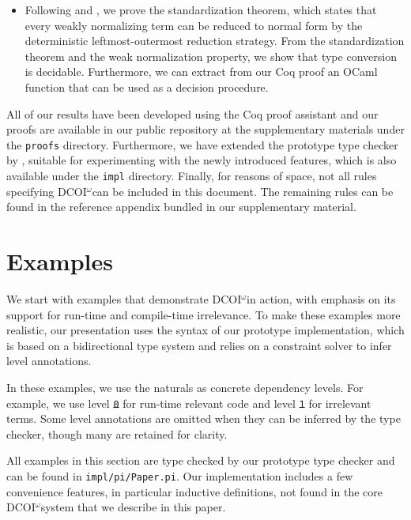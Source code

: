 \documentclass[acmsmall, screen=true, nonacm=true,
  review=\ifpublic false\else true\fi,
  anonymous=\ifanonymous true\else false\fi
]{acmart}
\makeatletter
\newcommand{\sw}[1]{}
\newcommand{\jc}[1]{}
\newcommand{\name}{\texorpdfstring{DCOI$^{\omega}$\@\xspace}{DCOI-omega}}
\newcommand{\repo}{%
  \ifpublic our public repository at \jc{TODO: replace with repo URL}%
  \else the supplementary materials%
  \fi
}
\providecommand{\DIFadd}[1]{{\protect\color{blue}\uwave{#1}}} %
\providecommand{\DIFdel}[1]{{\protect\color{red}\sout{#1}}}                      %
\providecommand{\DIFaddbegin}{} %
\providecommand{\DIFaddend}{} %
\providecommand{\DIFdelbegin}{} %
\providecommand{\DIFdelend}{} %
\makeatother
\begin{document}
\begin{itemize}[leftmargin=\parindent]
\item Following \citet{takahashi:par} and
  \citet{accattoli:factorization}, we prove the standardization
  theorem, which states that every weakly normalizing term can be
  reduced to normal form by the deterministic leftmost-outermost reduction
  strategy. From the standardization theorem and the weak
  normalization property, we show that type conversion is decidable.
  Furthermore, we can extract from our Coq proof an OCaml function that can
  be used as a decision procedure.
\end{itemize}

All of our results have been developed using the Coq proof
assistant and our proofs are available in \repo{} under the \texttt{proofs} directory.
Furthermore, we have extended the prototype type checker by
\citet{liu:dcoi},
suitable for experimenting with the newly introduced features,
which is also available under the \texttt{impl} directory.
\ifsubmission
Finally, for reasons of space, not all rules specifying \name can be included
in this document. The remaining rules can be found in the reference appendix
bundled in our supplementary material.
\fi

\section{Examples} \label{sec:examples}

We start with examples that demonstrate \name in action, with emphasis on its
support for run-time and compile-time irrelevance.  To make these examples more
realistic, our presentation uses the syntax of our prototype
implementation, which is based on a bidirectional type system and
relies on a constraint solver to infer level annotations.

In these examples, we use the naturals as concrete dependency levels. For example,
we use level \texttt{\DIFdelbegin \DIFdel{0}\DIFdelend \DIFaddbegin \DIFadd{L}\DIFaddend } for run-time relevant code and level \texttt{\DIFdelbegin \DIFdel{1}\DIFdelend \DIFaddbegin \DIFadd{H}\DIFaddend } for irrelevant terms. Some level annotations are omitted when they can be inferred by the type checker, though many are retained for
clarity.

All examples in this section are type checked by our prototype type checker
and can be found in \texttt{impl/pi/Paper.pi}.
Our implementation includes a few convenience features,
in particular inductive definitions,
not found in the core \name system that we describe in this paper.
\sw{Perhaps we
  should replace the False elimination example with \texttt{divides\_to\_Nat}
  from \texttt{impl/pi/Prime.pi}? This only requires natural number induction,
  although it is a lot more complicated of an example.}
\sw{I wish we had more space around the code to set it off in this section}
\end{document}
